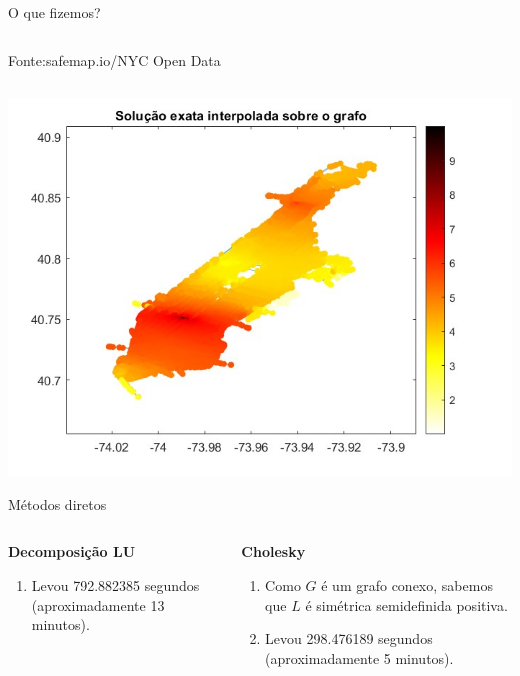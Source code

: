 \documentclass{beamer} %
\theoremstyle{definition}
\begin{document}
\begin{frame}{O que fizemos?}
\begin{columns}
\begin{column}{0.5\textwidth}
            \caption{\scriptsize{Fonte:safemap.io/NYC Open Data}}
        \end{column}
    \end{columns}
    \end{frame}
    
    \begin{frame}
        \centering
        \includegraphics[width=\textwidth]{exactsolution.jpeg}
    \end{frame}

    \begin{frame}{Métodos diretos}
        \pause
        \begin{columns}
            \begin{column}{0.5\textwidth}
                \textbf{Decomposição LU}
                \pause
                    \begin{enumerate}
                        \item Levou 792.882385 segundos (aproximadamente 13 minutos).
                    \end{enumerate}
            \end{column}

            \begin{column}{0.5\textwidth}
                \pause
                \textbf{Cholesky}
                \pause
                    \begin{enumerate}
                        \item Como $G$ é um grafo conexo, sabemos que $L$ é simétrica semidefinida positiva.
                        \pause
                        \item Levou 298.476189 segundos (aproximadamente 5 minutos).
                    \end{enumerate}
                
            \end{column}
        \end{columns}
    \end{frame}
\end{document}
